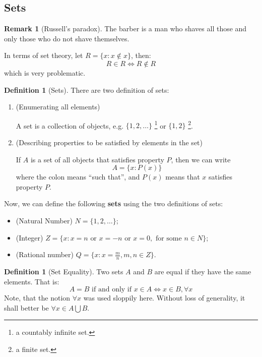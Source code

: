 \documentclass[12pt]{article}
\theoremstyle{definition}
\newtheorem{definition}[theorem]{Definition}
\newtheorem{remark}[theorem]{Remark}
\theoremstyle{plain}
\begin{document}
\subsection{Sets}
\begin{remark}[Russell's paradox]
    The barber is a man who shaves all those and only those who do not shave
    themselves.

    In terms of set theory, let $R = \{ x : x \not \in x\}$, then:
    \[
        R \in R \iff R \not \in R
    \]
    which is very problematic.
\end{remark}

\begin{definition}[Sets]
    There are two definition of sets:
    \begin{enumerate}
        \item (Enumerating all elements)

            A set is a collection of objects, e.g. $\{1,2,\ldots\}$ \footnote{a countably
            infinite set.} or $\{1,2\}$ \footnote{a finite set.}.
        \item (Describing properties to be satisfied by elements in the set)

            If $A$ is a set of all objects that satisfies property $P$, then we
            can write
            \[
                A = \{ x : P(x)\}
            \]
            where the colon means ``such that'', and $P(x)$ means that $x$
            satisfies property $P$.
    \end{enumerate}
\end{definition}

Now, we can define the following \textbf{sets} using the two definitions of sets:
\begin{itemize}
    \item (Natural Number) $N = \{ 1, 2, \ldots\}$;
    \item (Integer) $Z = \{ x: x = n \text{ or } x = -n \text{ or } x = 0,
        \text{ for some } n \in N\}$;
    \item (Rational number) $Q = \{ x : x = \frac{m}{n}, m,n \in Z\}.$
\end{itemize}

\begin{definition}
    [Set Equality]
    Two sets $A$ and $B$ are equal if they have the same elements. That is:
    \[
        A = B \text{ if and only if } x \in A \iff x \in B, \forall x
    \]
    Note, that the notion $\forall x$ was used sloppily here. Without loss of
    generality, it shall better be $\forall x \in A \bigcup B$.
\end{definition}
\end{document}
